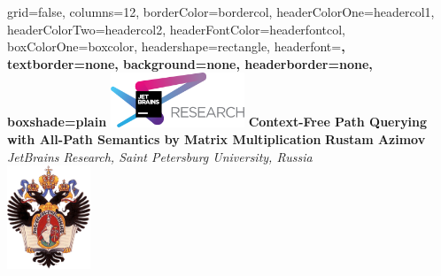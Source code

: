 \documentclass[a0paper,landscape]{baposter}
\begin{document}
\setlength{\fboxsep}{0pt}


\begin{poster}{
grid=false,
columns=12, %
borderColor=bordercol, %
headerColorOne=headercol1, %
headerColorTwo=headercol2, %
headerFontColor=headerfontcol, %
boxColorOne=boxcolor, %
headershape=rectangle, %
headerfont=\Large\sf\bf, %
textborder=none,
background=none,
headerborder=none, %
boxshade=plain
}
{\includegraphics[width=4cm]{jr.png}}
%
%
{\bf \huge{Context-Free Path Querying with All-Path Semantics by Matrix Multiplication} }
{\vspace{0.6em} \smaller \textbf{Rustam Azimov} \\  %
\smaller \it {JetBrains Research, Saint Petersburg University, Russia } \\ %
}
{\includegraphics[width=2.5cm]{SPbGU_Logo.png}} %



\end{poster}
\end{document}
